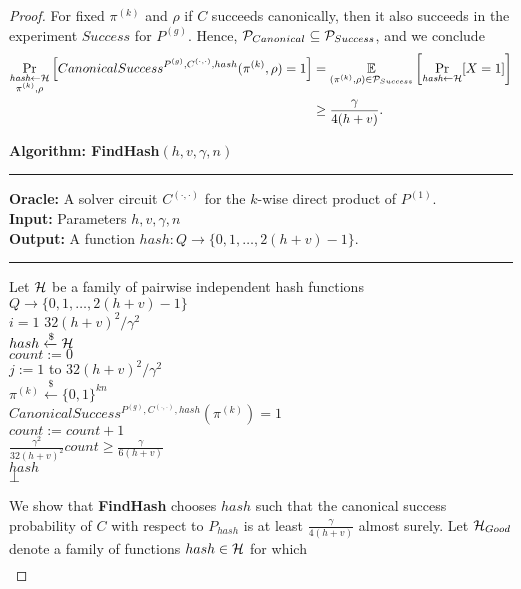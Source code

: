 \begin{proof}
For fixed $\pi^{(k)}$ and $\rho$ if $C$ succeeds canonically, then it also succeeds in the experiment $Success$ for $P^{(g)}$.
Hence, $\mathcal{P}_{Canonical} \subseteq \mathcal{P}_{Success}$, and we conclude
\begin{align}
  \label{ineq:hash_high_prob}
\underset{\substack{\textit{hash} \leftarrow \mathcal{H} \\ \pi^{(k)}, \rho}}{\Pr}\left[CanonicalSuccess^{P^{(g)}, C^{(\cdot, \cdot)}, hash}(\pi^{(k)}, \rho) = 1\right] &=
\underset{{(\pi^{(k)},\rho) \in \mathcal{P}_{Success}}}{\mathbb{E}}\left[\underset{\substack{\textit{hash} \leftarrow \mathcal{H}}}{\Pr}[X = 1]\right] \notag\\
&\geq \frac{\gamma}{4(h+v)}.
\end{align}
%
\begin{codeblock}
  \textbf{Algorithm: FindHash}$(h, v, \gamma, n)$
  \medskip
  \hrule
  \medskip
  \textbf{Oracle:} A solver circuit $C^{(\cdot, \cdot)}$ for the $k$-wise direct product of $P^{(1)}$. \\
  \textbf{Input:} Parameters $ h,v,\gamma,n$\\
  \textbf{Output:} A function $hash:Q \rightarrow \{0,1, \dots, 2(h+v)-1 \}$.
  \medskip\hrule\medskip
  Let $\mathcal{H}$ be a family of pairwise independent hash functions $Q \rightarrow \{0,1,\dots, 2(h+v)-1\}$\\
  \For $i = 1$ \To $32(h+v)^2/\gamma^2$ \Do \\
  \IndI $hash \xleftarrow{\$} \mathcal{H}$ \\
  \IndI $count := 0$ \\
  \IndI \For $j := 1$ to $32(h+v)^2/\gamma^2$ \Do \\
  \IndII $\pi^{(k)} \xleftarrow{\$} \{0,1\}^{kn} $\\
  \IndII \If $CanonicalSuccess^{P^{(g)}, C^{(\cdot, \cdot)}, hash}(\pi^{(k)}) = 1$ \then \\
  \IndIII $count := count + 1$\\
  \IndI \If $\frac{\gamma^2}{32(h+v)^2} count \geq \frac{\gamma}{6(h+v)}$ \then \\
  \IndII \return $hash$\\
  \return $\bot$
\end{codeblock}
We show that \textbf{FindHash} chooses $hash$ such
that the canonical success probability of $C$
with respect to $P_{hash}$ is at least $\frac{\gamma}{4(h+v)}$ almost surely.
Let $\mathcal{H}_{Good}$ denote a family of functions $hash \in \mathcal{H}$ for which
\begin{align*}

\end{align*}
\end{proof}
